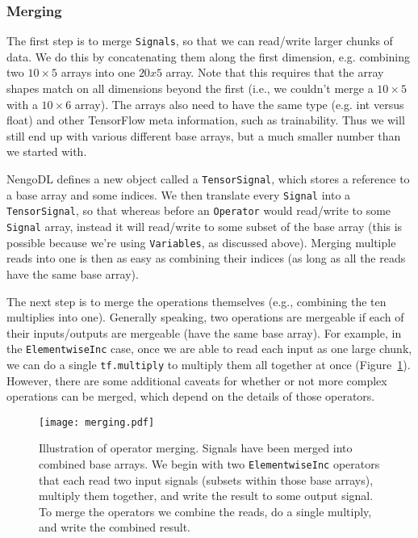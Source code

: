 \documentclass{article}
\begin{document}
\subsubsection{Merging}
\label{sec:merging}

The first step is to merge \texttt{Signals}, so that we can read/write larger chunks of data.  We do this by concatenating them along the first dimension, e.g. combining two $10 \times 5$ arrays into one $20 x 5$ array.  Note that this requires that the array shapes match on all dimensions beyond the first (i.e., we couldn't merge a $10 \times 5$ with a $10 \times 6$ array).  The arrays also need to have the same type (e.g. int versus float) and other TensorFlow meta information, such as trainability.  Thus we will still end up with various different base arrays, but a much smaller number than we started with.

NengoDL defines a new object called a \texttt{TensorSignal}, which stores a reference to a base array and some indices.  We then translate every \texttt{Signal} into a \texttt{TensorSignal}, so that whereas before an \texttt{Operator} would read/write to some \texttt{Signal} array, instead it will read/write to some subset of the base array (this is possible because we're using \texttt{Variables}, as discussed above).  Merging multiple reads into one is then as easy as combining their indices (as long as all the reads have the same base array).

The next step is to merge the operations themselves (e.g., combining the ten multiplies into one).  Generally speaking, two operations are mergeable if each of their inputs/outputs are mergeable (have the same base array).  For example, in the \texttt{ElementwiseInc} case, once we are able to read each input as one large chunk, we can do a single \texttt{tf.multiply} to multiply them all together at once (Figure~\ref{fig:merging}).  However, there are some additional caveats for whether or not more complex operations can be merged, which depend on the details of those operators.

\begin{figure}
\centering
\texttt{[image: merging.pdf]}
\caption{Illustration of operator merging.  Signals have been merged into combined base arrays.  We begin with two \texttt{ElementwiseInc} operators that each read two input signals (subsets within those base arrays), multiply them together, and write the result to some output signal.  To merge the operators we combine the reads, do a single multiply, and write the combined result.}
\label{fig:merging}
\end{figure}
\end{document}
